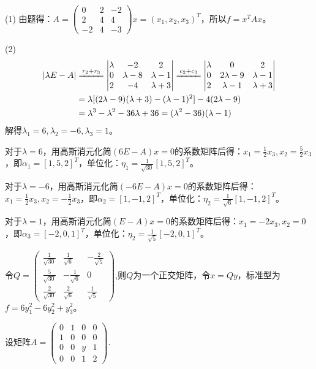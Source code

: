 \documentclass[a4paper]{report}
\begin{document}
\begin{jie}
(1)
由题得：$
A=
\begin{pmatrix}
0&2&-2\\
2&4&4\\
-2&4&-3
\end{pmatrix}x=(x_1,x_2,x_3)^T
$，所以$f=x^TAx$。

(2)
\begin{align*}
|\lambda E-A|&\xlongequal{r_2+r_3}
\begin{vmatrix}
\lambda&-2&2\\
0&\lambda-8&\lambda-1\\
2&-4&\lambda+3
\end{vmatrix}\xlongequal{c_2+c_3}
\begin{vmatrix}
\lambda&0&2\\
0&2\lambda-9&\lambda-1\\
2&\lambda-1&\lambda+3
\end{vmatrix}\\&=\lambda[(2\lambda-9)(\lambda+3)-(\lambda-1)^2]-4(2\lambda-9)\\
&=\lambda^3-\lambda^2-36\lambda+36=(\lambda^2-36)(\lambda-1)
\end{align*}
解得$\lambda_1=6,\lambda_2=-6,\lambda_3=1$。

对于$\lambda=6$，用高斯消元化简$(6E-A)x=0$的系数矩阵后得：$x_1=\frac{1}{2}x_3,x_2=\frac{5}{2}x_3$，即$\alpha_1=[1,5,2]^T$，单位化：$\eta_1=\frac{1}{\sqrt{30}}
[1,5,2]^T
$。

对于$\lambda=-6$，用高斯消元化简$(-6E-A)x=0$的系数矩阵后得：$x_1=\frac{1}{2}x_3,x_2=-\frac{1}{2}x_3$，即$\alpha_2=[1,-1,2]^T$，单位化：$\eta_2=\frac{1}{\sqrt{6}}
[1,-1,2]^T
$。

对于$\lambda=1$，用高斯消元化简$(E-A)x=0$的系数矩阵后得：$x_1=-2x_3,x_2=0$，即$\alpha_3=[-2,0,1]^T$，单位化：$\eta_2=\frac{1}{\sqrt{5}}
[-2,0,1]^T
$。

令$Q=
\begin{pmatrix}
\frac{1}{\sqrt{30}}&\frac{1}{\sqrt{6}}&-\frac{2}{\sqrt{5}}\\
\frac{5}{\sqrt{30}}&-\frac{1}{\sqrt{6}}&0\\
\frac{2}{\sqrt{30}}&\frac{2}{\sqrt{6}}&\frac{1}{\sqrt{5}}
\end{pmatrix}
$,则$Q$为一个正交矩阵，令$x=Qy$，标准型为$f=6y_1^2-6y_2^2+y_3^2$。
\end{jie}

\EX 设矩阵$
A=
\begin{pmatrix}
0&1&0&0\\
1&0&0&0\\
0&0&y&1\\
0&0&1&2
\end{pmatrix}
$.
\end{document}

